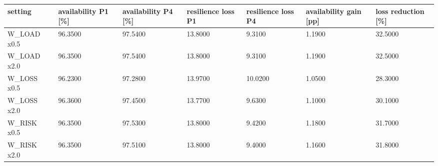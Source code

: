 \begin{tabular}{lllllll}
\toprule
setting & availability P1 [\%] & availability P4 [\%] & resilience loss P1 & resilience loss P4 & availability gain [pp] & loss reduction [\%] \\
\midrule
W\_LOAD x0.5 & 96.3500 & 97.5400 & 13.8000 & 9.3100 & 1.1900 & 32.5000 \\
W\_LOAD x2.0 & 96.3500 & 97.5400 & 13.8000 & 9.3100 & 1.1900 & 32.5000 \\
W\_LOSS x0.5 & 96.2300 & 97.2800 & 13.9700 & 10.0200 & 1.0500 & 28.3000 \\
W\_LOSS x2.0 & 96.3600 & 97.4500 & 13.7700 & 9.6300 & 1.1000 & 30.1000 \\
W\_RISK x0.5 & 96.3500 & 97.5300 & 13.8000 & 9.4200 & 1.1800 & 31.7000 \\
W\_RISK x2.0 & 96.3500 & 97.5100 & 13.8000 & 9.4000 & 1.1600 & 31.8000 \\
\bottomrule
\end{tabular}
